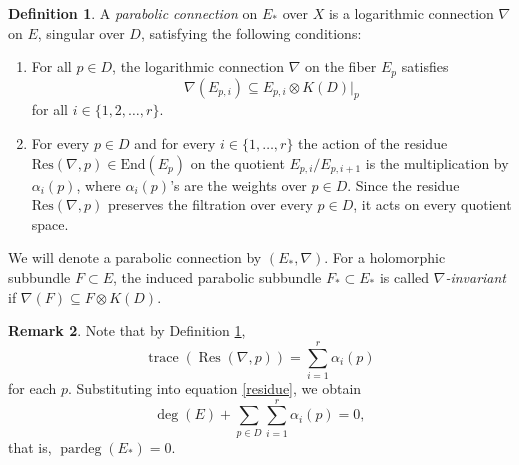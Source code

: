 \documentclass[11pt, reqno]{amsart}
\numberwithin{equation}{section}
\theoremstyle{definition}
\newtheorem{definition}{Definition}[section]
\newtheorem{remark}[definition]{Remark}
\begin{document}
	
	\begin{definition}\label{pconn}
		A \textit{parabolic connection} on $E_*$ over $X$ is a logarithmic connection $\nabla$ on $E$, singular over $D$, satisfying the following conditions:
		\begin{enumerate}
			\item For all $p \in D$, the logarithmic connection $\nabla$ on the fiber $E_p$ satisfies 
			\[
			\nabla(E_{p,i}) \subseteq E_{p,i} \otimes \left.K(D)\right|_p
			\]
			for all $i \in \{1,2,\dots ,r\}$.
			\item For every $p \in D$ and for every $i \in \{1,\dots , r\}$ the action of the residue $\mathrm{Res}(\nabla,p) \in \mathrm{End}(E_p)$ on the quotient $E_{p,i}/E_{p,i+1}$ is the multiplication by $\alpha_{i}(p)$, where $\alpha_{i}(p)$'s are the weights over $p \in D$. Since the residue $\mathrm{Res}(\nabla,p)$ preserves the filtration over every $p\in D$, it acts on every quotient space.
		\end{enumerate}
	\end{definition}	
	We will denote a parabolic connection by $(E_*,\nabla)$. For a holomorphic subbundle $F \subset E$, the induced parabolic subbundle $F_* \subset E_*$ is called $\nabla$\textit{-invariant} if $\nabla(F) \subseteq F \otimes K(D)$.

    \begin{remark}\label{degreezero}
        \noindent
Note that by Definition \ref{pconn}, $$\operatorname{trace}(\operatorname{Res}(\nabla, p)) = \sum_{i=1}^{r} \alpha_{i}(p)$$ for each $p$. Substituting into equation \eqref{residue}, we obtain
\[
\deg(E) + \sum_{p \in D} \sum_{i=1}^{r} \alpha_{i}(p) = 0,
\]
that is, $\operatorname{pardeg}(E_*) = 0$.

    \end{remark}
	
\end{document}
